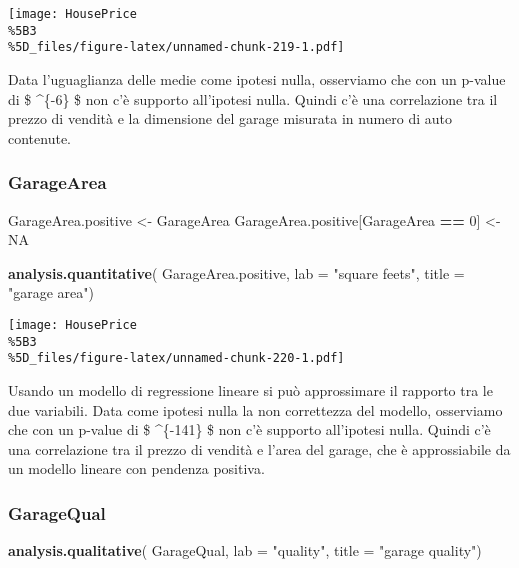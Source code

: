 \documentclass[
]{article}
\newenvironment{Shaded}{\begin{snugshade}}{\end{snugshade}}
\newcommand{\AttributeTok}[1]{\textcolor[rgb]{0.13,0.29,0.53}{#1}}
\newcommand{\ConstantTok}[1]{\textcolor[rgb]{0.56,0.35,0.01}{#1}}
\newcommand{\DecValTok}[1]{\textcolor[rgb]{0.00,0.00,0.81}{#1}}
\newcommand{\FunctionTok}[1]{\textcolor[rgb]{0.13,0.29,0.53}{\textbf{#1}}}
\newcommand{\NormalTok}[1]{#1}
\newcommand{\OtherTok}[1]{\textcolor[rgb]{0.56,0.35,0.01}{#1}}
\newcommand{\SpecialCharTok}[1]{\textcolor[rgb]{0.81,0.36,0.00}{\textbf{#1}}}
\newcommand{\StringTok}[1]{\textcolor[rgb]{0.31,0.60,0.02}{#1}}
\begin{document}
\texttt{[image: HousePrice\\\%5B3\\\%5D\_files/figure-latex/unnamed-chunk-219-1.pdf]}

Data l'uguaglianza delle medie come ipotesi nulla, osserviamo che con un
p-value di \$ \^{}\{-6\} \$ non c'è supporto all'ipotesi
nulla. Quindi c'è una correlazione tra il prezzo di vendità e la
dimensione del garage misurata in numero di auto contenute.

\subsubsection{GarageArea}\label{garagearea-1}

\begin{Shaded}
\begin{Highlighting}[]
\NormalTok{GarageArea.positive }\OtherTok{\textless{}{-}}\NormalTok{ GarageArea}
\NormalTok{GarageArea.positive[GarageArea }\SpecialCharTok{==} \DecValTok{0}\NormalTok{] }\OtherTok{\textless{}{-}} \ConstantTok{NA}

\FunctionTok{analysis.quantitative}\NormalTok{(}
\NormalTok{    GarageArea.positive,}
    \AttributeTok{lab =} \StringTok{"square feets"}\NormalTok{,}
    \AttributeTok{title =} \StringTok{"garage area"}\NormalTok{)}
\end{Highlighting}
\end{Shaded}

\texttt{[image: HousePrice\\\%5B3\\\%5D\_files/figure-latex/unnamed-chunk-220-1.pdf]}

Usando un modello di regressione lineare si può approssimare il rapporto
tra le due variabili. Data come ipotesi nulla la non correttezza del
modello, osserviamo che con un p-value di \$ \^{}\{-141\} \$
non c'è supporto all'ipotesi nulla. Quindi c'è una correlazione tra il
prezzo di vendità e l'area del garage, che è approssiabile da un modello
lineare con pendenza positiva.

\subsubsection{GarageQual}\label{garagequal-1}

\begin{Shaded}
\begin{Highlighting}[]
\FunctionTok{analysis.qualitative}\NormalTok{(}
\NormalTok{    GarageQual,}
    \AttributeTok{lab =} \StringTok{"quality"}\NormalTok{,}
    \AttributeTok{title =} \StringTok{"garage quality"}\NormalTok{)}
\end{Highlighting}
\end{Shaded}
\end{document}
